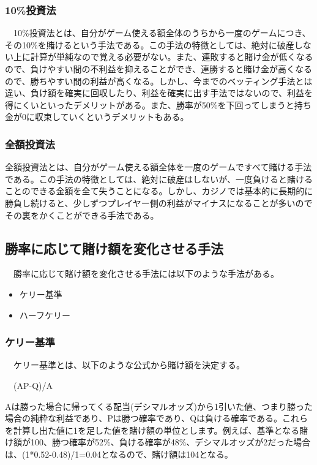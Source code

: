 \subsubsection{10\%投資法}
　10\%投資法とは、自分がゲーム使える額全体のうちから一度のゲームにつき、その10\%を賭けるという手法である。この手法の特徴としては、絶対に破産しない上に計算が単純なので覚える必要がない。また、連敗すると賭け金が低くなるので、負けやすい間の不利益を抑えることができ、連勝すると賭け金が高くなるので、勝ちやすい間の利益が高くなる。しかし、今までのベッティング手法とは違い、負け額を確実に回収したり、利益を確実に出す手法ではないので、利益を得にくいといったデメリットがある。また、勝率が50\%を下回ってしまうと持ち金が0に収束していくというデメリットもある。
\subsubsection{全額投資法}全額投資法とは、自分がゲーム使える額全体を一度のゲームですべて賭ける手法である。この手法の特徴としては、絶対に破産はしないが、一度負けると賭けることのできる金額を全て失うことになる。しかし、カジノでは基本的に長期的に勝負し続けると、少しずつプレイヤー側の利益がマイナスになることが多いのでその裏をかくことができる手法である。

\subsection{勝率に応じて賭け額を変化させる手法}
　勝率に応じて賭け額を変化させる手法には以下のような手法がある。
  \begin{itemize}
 \item ケリー基準
 \item ハーフケリー
 \end{itemize}
\subsubsection{ケリー基準}
　ケリー基準とは、以下のような公式から賭け額を決定する。
\begin{center}　(AP-Q)/A　
\end{center}
Aは勝った場合に帰ってくる配当(デシマルオッズ)から1引いた値、つまり勝った場合の純粋な利益であり、Pは勝つ確率であり、Qは負ける確率である。これらを計算し出た値に1を足した値を賭け額の単位とします。例えば、基準となる賭け額が100、勝つ確率が52\%、負ける確率が48\%、デシマルオッズが2だった場合は、(1*0.52-0.48)/1=0.04となるので、賭け額は104となる。
